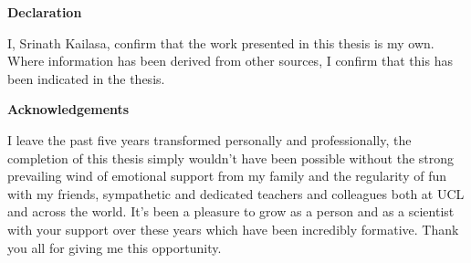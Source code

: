 \thispagestyle{plain}

\begin{center}
    \textbf{Declaration}
\end{center}
I, Srinath Kailasa, confirm that the work presented in this thesis is my own. Where information has been derived from other sources, I confirm that this has been indicated in the thesis.


\begin{center}
    \textbf{Acknowledgements}
\end{center}

I leave the past five years transformed personally and professionally, the completion of this thesis simply wouldn't have been possible without the strong prevailing wind of emotional support from my family and the regularity of fun with my friends, sympathetic and dedicated teachers and colleagues both at UCL and across the world. It's been a pleasure to grow as a person and as a scientist with your support over these years which have been incredibly formative. Thank you all for giving me this opportunity.